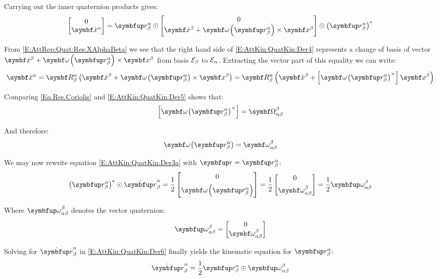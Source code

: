 Carrying out the inner quaternion products gives:
\begin{equation} \label{E:AttKin:QuatKin:Der4}
	\qcol{0}{\vprj{\dot{x}}{\alpha}}
	= \RotQ{\alpha}{\beta} \qprod
	\qcol{0}{\vprj{\dot{x}}{\beta} + \qvangv{\RotQ{\alpha}{\beta}} \times \vprj{x}{\beta}} \qprod \RotQcon{\alpha}{\beta} 
\end{equation}

From \eqref{E:AttRep:Quat:Res:XAlphaBeta} we see that the right hand side of \eqref{E:AttKin:QuatKin:Der4} represents a change of basis of vector $\vprj{\dot{x}}{\beta} + \qvangv{\RotQ{\alpha}{\beta}} \times \vprj{x}{\beta}$ from basis $\basis[\beta]$ to $\basis[\alpha]$. Extracting the vector part of this equality we can write:
\begin{equation} \label{E:AttKin:QuatKin:Der5}
	\vprj{\dot{x}}{\alpha} =
	\RotM{\alpha}{\beta} \left(\vprj{\dot{x}}{\beta} + \qvangv{\RotQ{\alpha}{\beta}} \times \vprj{x}{\beta}\right) =
	\RotM{\alpha}{\beta} \left( \vprj{\dot{x}}{\beta} + \vskew{\qvangv{\RotQ{\alpha}{\beta}}} \vprj{x}{\beta} \right)
\end{equation}

Comparing \eqref{Eq.Res.Coriolis} and \eqref{E:AttKin:QuatKin:Der5} shows that:
\begin{equation*}
	\vskew{\qvangv{\RotQ{\alpha}{\beta}}} = \AngVelSkew{\alpha}{\beta}{\beta}
\end{equation*}

And therefore:
\begin{equation*}
	 \qvangv{\RotQ{\alpha}{\beta}} = \angvel{\alpha}{\beta}{\beta}
\end{equation*}

We may now rewrite equation \eqref{E:AttKin:QuatKin:Der3a} with $\quat{\rotq} = \RotQ{\alpha}{\beta}$:
\begin{equation}
	\RotQcon{\alpha}{\beta} \qprod \RotQdot{\alpha}{\beta} =
	\dfrac{1}{2} \qcol[1ex]{0}{\qvangv{\RotQ{\alpha}{\beta}}} =
	\dfrac{1}{2} \qcol[1ex]{0}{\angvel{\alpha}{\beta}{\beta}} =
	\dfrac{1}{2} \relprj{\quat{\omega}}{\alpha}{\beta}{\beta} \label{E:AttKin:QuatKin:Der6}
\end{equation}

Where $\relprj{\quat{\omega}}{\alpha}{\beta}{\beta}$ denotes the vector quaternion:
\begin{equation*}
	\relprj{\quat{\omega}}{\alpha}{\beta}{\beta} = \qcol{0}{\angvel{\alpha}{\beta}{\beta}}
\end{equation*}

Solving for $\RotQdot{\alpha}{\beta}$ in \eqref{E:AttKin:QuatKin:Der6} finally yields the kinematic equation for $\RotQ{\alpha}{\beta}$:
\begin{equation} \label{E:AttKin:QuatKin:Res:RotQdot}
	\RotQdot{\alpha}{\beta} = \dfrac{1}{2} \RotQ{\alpha}{\beta} \qprod \relprj{\quat{\omega}}{\alpha}{\beta}{\beta}
\end{equation}

